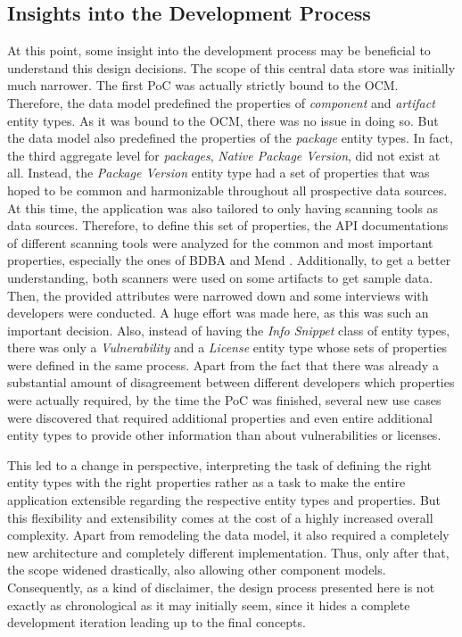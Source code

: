 \subsection{Insights into the Development Process} \label{sec:Insights into the Development Process}
At this point, some insight into the development process may be beneficial to understand this design decisions. The scope of this central data store was initially much narrower. The first PoC was actually strictly bound to the OCM. Therefore, the data model predefined the properties of \emph{component} and \emph{artifact} entity types. As it was bound to the OCM, there was no issue in doing so. But the data model also predefined the properties of the \emph{package} entity types. In fact, the third aggregate level for \emph{packages}, \emph{Native Package Version}, did not exist at all. Instead, the \emph{Package Version} entity type had a set of properties that was hoped to be common and harmonizable throughout all prospective data sources. At this time, the application was also tailored to only having scanning tools as data sources. Therefore, to define this set of properties, the API documentations of different scanning tools were analyzed for the common and most important properties, especially the ones of BDBA and Mend \cite{MendAPI}. Additionally, to get a better understanding, both scanners were used on some artifacts to get sample data. Then, the provided attributes were narrowed down and some interviews with developers were conducted. A huge effort was made here, as this was such an important decision. Also, instead of having the \emph{Info Snippet} class of entity types, there was only a \emph{Vulnerability} and a \emph{License} entity type whose sets of properties were defined in the same process. Apart from the fact that there was already a substantial amount of disagreement between different developers which properties were actually required, by the time the PoC was finished, several new use cases were discovered that required additional properties and even entire additional entity types to provide other information than about vulnerabilities or licenses.\par
This led to a change in perspective, interpreting the task of defining the right entity types with the right properties rather as a task to make the entire application extensible regarding the respective entity types and properties. But this flexibility and extensibility comes at the cost of a highly increased overall complexity. Apart from remodeling the data model, it also required a completely new architecture and completely different implementation. Thus, only after that, the scope widened drastically, also allowing other component models. Consequently, as a kind of disclaimer, the design process presented here is not exactly as chronological as it may initially seem, since it hides a complete development iteration leading up to the final concepts.

